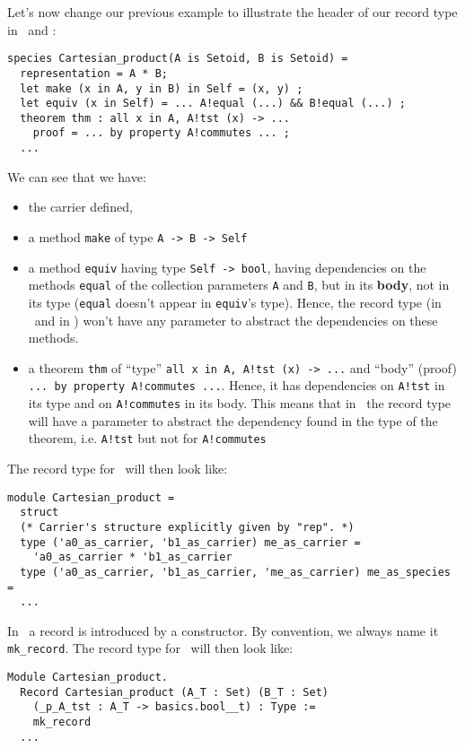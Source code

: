 Let's now change our previous example to illustrate the header of our
record type in \ocaml\ and \coq:

{\footnotesize
\begin{lstlisting}
species Cartesian_product(A is Setoid, B is Setoid) =
  representation = A * B;
  let make (x in A, y in B) in Self = (x, y) ;
  let equiv (x in Self) = ... A!equal (...) && B!equal (...) ;
  theorem thm : all x in A, A!tst (x) -> ...
    proof = ... by property A!commutes ... ;
  ...
\end{lstlisting}
}

We can see that we have:
\begin{itemize}
\item the carrier defined,
\item a method {\tt make} of type {\tt A -> B -> Self}
\item a method {\tt equiv} having type {\tt Self -> bool}, having
  dependencies on the methods {\tt equal} of the collection parameters
  {\tt A} and {\tt B}, but in its {\bf body}, not in its type
  ({\tt equal} doesn't appear in {\tt equiv}'s type). Hence, the
  record type (in \coq\ and in \ocaml) won't have any parameter to
  abstract the dependencies on these methods.
\item a theorem {\tt thm} of ``type''
  {\tt all x in A, A!tst (x) -> ...} and ``body'' (proof)
  {\tt ... by property A!commutes ...}. Hence, it has dependencies on
  {\tt A!tst} in its type and on {\tt A!commutes} in its body. This
  means that in \coq\ the record type will have a parameter to abstract
  the dependency found in the type of the theorem, i.e. {\tt A!tst}
  but not for {\tt A!commutes}
\end{itemize}

The record type for \ocaml\ will then look like:
{\footnotesize
\begin{lstlisting}[language=MyOCaml]
module Cartesian_product =
  struct
  (* Carrier's structure explicitly given by "rep". *)
  type ('a0_as_carrier, 'b1_as_carrier) me_as_carrier =
    'a0_as_carrier * 'b1_as_carrier
  type ('a0_as_carrier, 'b1_as_carrier, 'me_as_carrier) me_as_species =
  ...
\end{lstlisting}
}

In \coq\ a record is introduced by a constructor. By convention, we
always name it {\tt mk\_record}. The record type for \coq\ will then
look like:
{\footnotesize
\begin{lstlisting}[language=MyCoq]
Module Cartesian_product.
  Record Cartesian_product (A_T : Set) (B_T : Set)
    (_p_A_tst : A_T -> basics.bool__t) : Type :=
    mk_record
  ...
\end{lstlisting}
}

